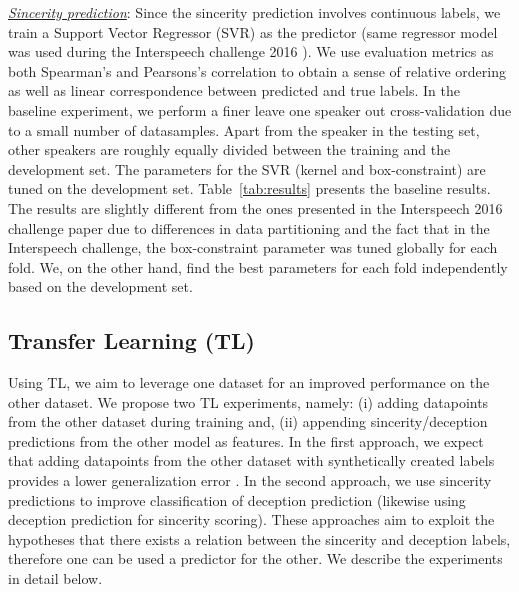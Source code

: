 \documentclass{article}
\begin{document}
\begin{spacing}{0.89}
\underline{\it Sincerity prediction}:
Since the sincerity prediction involves continuous labels, we train a Support Vector Regressor (SVR) as the predictor (same regressor model was used during the Interspeech challenge 2016 \cite{schuller2016interspeech}).
We use evaluation metrics as both Spearman's and Pearsons's correlation to obtain a sense of relative ordering as well as linear correspondence between predicted and true labels. 
In the baseline experiment, we perform a finer leave one speaker out cross-validation due to a small number of datasamples.
Apart from the speaker in the testing set, other speakers are roughly equally divided between the training and the development set.
The parameters for the SVR (kernel and box-constraint) are tuned on the development set. 
Table~\ref{tab:results} presents the baseline results.
The results are slightly different from the ones presented in the Interspeech 2016 challenge paper \cite{schuller2016interspeech} due to differences in data partitioning and the fact that in the Interspeech challenge, the box-constraint parameter was tuned globally for each fold.
We, on the other hand, find the best parameters for each fold independently based on the development set. 

\vspace{-2mm}
\subsection{Transfer Learning (TL)}
\vspace{-2mm}
Using TL, we aim to leverage one dataset for an improved performance on the other dataset.
We propose two TL experiments, namely: (i) adding datapoints from the other dataset during training and, (ii) appending sincerity/deception predictions from the other model as features.
In the first approach, we expect that adding datapoints from the other dataset with synthetically created labels provides a lower generalization error \cite{vapnik1998statistical}.
In the second approach, we use sincerity predictions to improve classification of deception prediction (likewise using deception prediction for sincerity scoring). 
These approaches aim to exploit the hypotheses that there exists a relation between the sincerity and deception labels, therefore one can be used a predictor for the other.
We describe the experiments in detail below. 

\vspace{-2mm}

\end{spacing}
\end{document}
